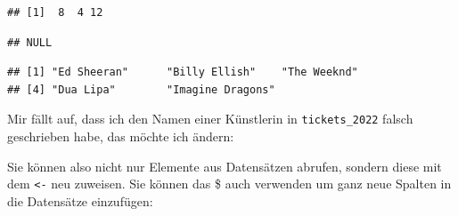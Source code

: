 \documentclass[
  ngerman,
]{book}
\newenvironment{Shaded}{\begin{snugshade}}{\end{snugshade}}
\newcommand{\CommentTok}[1]{\textcolor[rgb]{0.56,0.35,0.01}{\textit{#1}}}
\newcommand{\DecValTok}[1]{\textcolor[rgb]{0.00,0.00,0.81}{#1}}
\newcommand{\NormalTok}[1]{#1}
\newcommand{\OtherTok}[1]{\textcolor[rgb]{0.56,0.35,0.01}{#1}}
\newcommand{\SpecialCharTok}[1]{\textcolor[rgb]{0.81,0.36,0.00}{\textbf{#1}}}
\newcommand{\StringTok}[1]{\textcolor[rgb]{0.31,0.60,0.02}{#1}}
\begin{document}
\begin{verbatim}
## [1]  8  4 12
\end{verbatim}

\begin{Shaded}
\end{Shaded}

\begin{verbatim}
## NULL
\end{verbatim}

\begin{Shaded}
\end{Shaded}

\begin{verbatim}
## [1] "Ed Sheeran"      "Billy Ellish"    "The Weeknd"     
## [4] "Dua Lipa"        "Imagine Dragons"
\end{verbatim}

Mir fällt auf, dass ich den Namen einer Künstlerin in \texttt{tickets\_2022} falsch geschrieben habe, das möchte ich ändern:

\begin{Shaded}
\end{Shaded}

Sie können also nicht nur Elemente aus Datensätzen abrufen, sondern diese mit dem \texttt{\textless{}-} neu zuweisen. Sie können das \$ auch verwenden um ganz neue Spalten in die Datensätze einzufügen:
\end{document}
